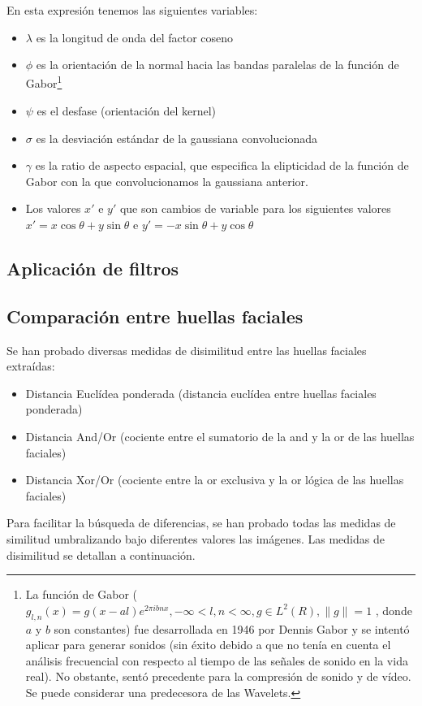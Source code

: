 En esta expresión tenemos las siguientes variables:
\begin{itemize}
	\item{$\lambda$ es la longitud de onda del factor coseno}
	\item{$\phi$ es la orientación de la normal hacia las bandas paralelas de la función de Gabor\footnote{La función de Gabor ($g_{l,n}(x)=g(x-al)e^{2\pi ibnx}, -\infty < l,n < \infty, g\in L^2(R), \parallel g \parallel=1$ , donde $a$ y $b$ son constantes) fue desarrollada en 1946 por Dennis Gabor y se intentó aplicar para generar sonidos (sin éxito debido a que no tenía en cuenta el análisis frecuencial con respecto al tiempo de las señales de sonido en la vida real). No obstante, sentó precedente para la compresión de sonido y de vídeo. Se puede considerar una predecesora de las Wavelets. } }
	\item{$\psi$ es el desfase (orientación del kernel) }
	\item{$\sigma$ es la desviación estándar de la gaussiana convolucionada}
	\item{$\gamma$ es la ratio de aspecto espacial, que especifica la elipticidad de la función de Gabor con la que convolucionamos la gaussiana anterior.}
	\item{Los valores $ x'$ e $y'$ que son cambios de variable para los siguientes valores $ x' =x\cos\theta + y\sin\theta $ e $ y'=-x\sin\theta + y\cos\theta $ }
\end{itemize}


\subsection{Aplicación de filtros}


\subsection{Comparación entre huellas faciales}
Se han probado diversas medidas de disimilitud entre las huellas faciales extraídas:
\begin{itemize}
	\item{Distancia Euclídea ponderada (distancia euclídea entre huellas faciales ponderada)}
	\item{Distancia And/Or (cociente entre el sumatorio de la and y la or de las huellas faciales)}
	\item{Distancia Xor/Or (cociente entre la or exclusiva y la or lógica de las huellas faciales)}
\end{itemize}
Para facilitar la búsqueda de diferencias, se han probado todas las medidas de similitud umbralizando bajo diferentes valores las imágenes.
Las medidas de disimilitud se detallan a continuación.

